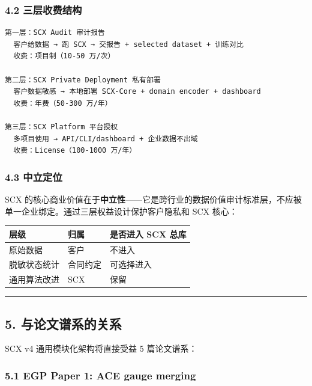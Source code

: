 \documentclass[
  12pt,
]{ctexart}
\begin{document}
\subsubsection{4.2
三层收费结构}\label{ux4e09ux5c42ux6536ux8d39ux7ed3ux6784}

\begin{verbatim}
第一层：SCX Audit 审计报告
  客户给数据 → 跑 SCX → 交报告 + selected dataset + 训练对比
  收费：项目制（10-50 万/次）

第二层：SCX Private Deployment 私有部署
  客户数据敏感 → 本地部署 SCX-Core + domain encoder + dashboard
  收费：年费（50-300 万/年）

第三层：SCX Platform 平台授权
  多项目使用 → API/CLI/dashboard + 企业数据不出域
  收费：License（100-1000 万/年）
\end{verbatim}

\subsubsection{4.3 中立定位}\label{ux4e2dux7acbux5b9aux4f4d}

SCX
的核心商业价值在于\textbf{中立性}------它是跨行业的数据价值审计标准层，不应被单一企业绑定。通过三层权益设计保护客户隐私和
SCX 核心：

\begin{longtable}[]{@{}lll@{}}
\toprule\noalign{}
层级 & 归属 & 是否进入 SCX 总库 \\
\midrule\noalign{}
\endhead
\bottomrule\noalign{}
\endlastfoot
原始数据 & 客户 & 不进入 \\
脱敏状态统计 & 合同约定 & 可选择进入 \\
通用算法改进 & SCX & 保留 \\
\end{longtable}

\begin{center}\rule{0.5\linewidth}{0.5pt}\end{center}

\subsection{5.
与论文谱系的关系}\label{ux4e0eux8bbaux6587ux8c31ux7cfbux7684ux5173ux7cfb}

SCX v4 通用模块化架构将直接受益 5 篇论文谱系：

\subsubsection{5.1 EGP Paper 1: ACE gauge
merging}\label{egp-paper-1-ace-gauge-merging}
\end{document}
